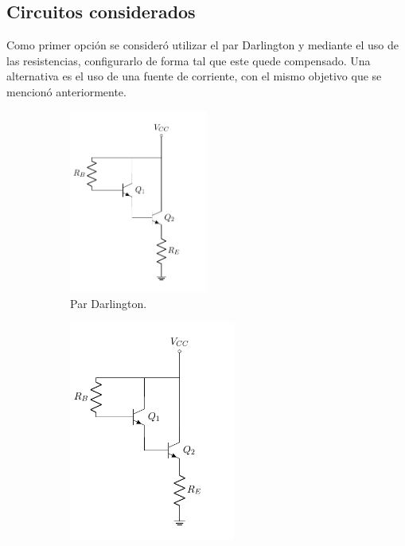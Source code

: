 \subsection{Circuitos considerados}
Como primer opción se consideró utilizar el par Darlington y mediante el uso de las resistencias, configurarlo de forma tal que este quede compensado. Una alternativa es el uso de una fuente de corriente, con el mismo objetivo que se mencionó anteriormente.
\begin{figure}[H]
\centering
\begin{subfigure}{.45\textwidth}
\centering
	\includegraphics[width=0.5\textwidth, page=1]{Imagenes/ParDarlington.pdf}
	\caption{Par Darlington.}
	\label{fig:pardar1}
\end{subfigure}
\begin{subfigure}{.4\textwidth}
\centering
	\includegraphics[width=0.6\textwidth, page=2]{Imagenes/ParDarlington.pdf}

\end{subfigure}
\end{figure}
